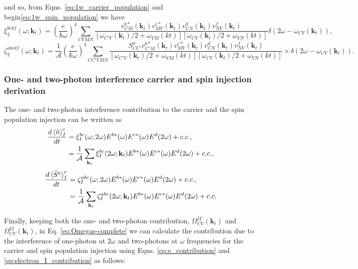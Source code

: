 \documentclass{article}
\newcommand{\kt}{\mathbf{k}_{t}}
\newcommand{\dw}{\delta(2\omega - \omega_{CV}(\kt))}
\begin{document}
and so, from Eqns. \eqref{eq:1w_carrier_population} and
begin\eqref{eq:1w_spin_population} we have 
\begin{equation}
\xi^{bcdf}_{2}(\omega;\kt) = \left(\frac{e}{\hbar\omega}\right)^{4}
\sum_{CVMN} \frac{v^{b*}_{CM}(\kt)v^{c*}_{MV}(\kt)
v^{d}_{CN}(\kt)v^{f}_{NV}(\kt)}
{[\omega_{C'V}(\kt)/2+\omega_{VM}(kt)][\omega_{CV}(\kt)/2+\omega_{VN}(kt)]} 
\dw,
\end{equation}
\begin{equation}\label{eq:2_spin_tensor}
\zeta^{abcdf}_{2}(\omega;\kt) = \frac{1}{\mathcal{A}} \left(\frac{e}{\hbar\omega}\right)^{4} 
\sum_{CC'VMN} \frac{S^{a}_{CC'} v^{b*}_{C'M}(\kt)v^{c*}_{MV}(\kt)
v^{d}_{CN}(\kt)v^{f}_{NV}(\kt)}
{[\omega_{C'V}(\kt)/2+\omega_{VM}(kt)][\omega_{CV}(\kt)/2+\omega_{VN}(kt)]} \times \dw.
\end{equation}

\subsubsection{One- and two-photon interference carrier and spin injection derivation}

The one-  and two-photon interference contribution to the carrier and the spin
population injection can be written as
\begin{equation}\label{eq:int_carrier_population}
\begin{split}
\frac{d\ev*{\hat{n}}^{e}_{I}}{dt} &=
\xi^{bc}_{I}(\omega;2\omega)E^{b*}(\omega)E^{c*}(\omega)E^{d}(2\omega) + c.c., \\
&= \frac{1}{\mathcal{A}}\sum_{\kt}\xi^{bc}_{I}(2\omega;\kt) 
E^{b*}(\omega)E^{c*}(\omega)E^{d}(2\omega) + c.c. ,
\end{split}
\end{equation}
\begin{equation}\label{eq:int_spin_population}
\begin{split}
\frac{d\ev*{\hat{S}^{a}}^{e}_{I}}{dt} &=
\zeta^{abc}_{I}(\omega;2\omega)E^{b*}(\omega)E^{c*}(\omega)E^{d}(2\omega) + c.c. ,\\
&= \frac{1}{\mathcal{A}}\sum_{\kt}\zeta^{abc}_{I}(2\omega;\kt)
E^{b*}(\omega)E^{c*}(\omega)E^{d}(2\omega) + c.c.
\end{split}
\end{equation}

Finally, keeping both the one- and two-photon
contribution, $\Omega^{II}_{CV}(\kt)$ and $\Omega^{II}_{CV}(\kt)$, in Eq.
\eqref{eq:Omegas-complete} we can calculate the contribution due to the
interference of one-photon at $2\omega$ and two-photons at $\omega$ frequencies
for the carrier and spin population injection using Eqns.
\eqref{eq:e_contribution} and \eqref{eq:electron_I_contribution} as follows:
\end{document}
